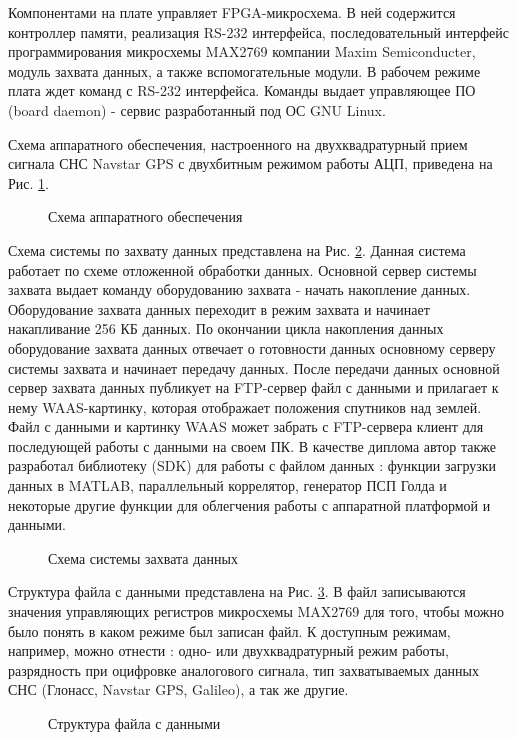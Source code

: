 Компонентами на плате управляет FPGA-микросхема. В ней содержится контроллер памяти, реализация RS-232 интерфейса, последовательный интерфейс программирования микросхемы
MAX2769 компании Maxim Semiconducter, модуль захвата данных, а также вспомогательные модули. В рабочем режиме плата ждет команд с RS-232 интерфейса.
Команды выдает управляющее ПО (board daemon) - сервис разработанный под ОС GNU Linux.

Схема аппаратного обеспечения, настроенного на двухквадратурный прием сигнала СНС Navstar GPS с двухбитным режимом работы АЦП, приведена на Рис. \ref{pic:board_scheme}.
\begin{figure}[h]
	\center{}
	\caption{Схема аппаратного обеспечения}
	\label{pic:board_scheme}
\end{figure}

Схема системы по захвату данных представлена на Рис. \ref{pic:gps_acq_system_scheme}. Данная система работает по схеме отложенной обработки данных. Основной сервер системы захвата
выдает команду оборудованию захвата - начать накопление данных. Оборудование захвата данных переходит в режим захвата и начинает накапливание 256 КБ данных. По окончании цикла
накопления данных оборудование захвата данных отвечает о готовности данных основному серверу системы захвата и начинает передачу данных. После передачи данных основной сервер
захвата данных публикует на FTP-сервер файл с данными и прилагает к нему WAAS-картинку, которая отображает положения спутников над землей. Файл с данными
и картинку WAAS может забрать с FTP-сервера клиент для последующей работы с данными на своем ПК. В качестве диплома автор также разработал библиотеку (SDK) для работы с файлом данных
\cite{github-gpsproject}: функции загрузки данных в MATLAB, параллельный коррелятор, генератор ПСП Голда и некоторые другие функции для облегчения работы с аппаратной платформой
и данными.

\begin{figure}[h]
	\center{}
	\caption{Схема системы захвата данных}
	\label{pic:gps_acq_system_scheme}
\end{figure}

Структура файла с данными представлена на Рис. \ref{pic:dump_file}. В файл записываются значения управляющих регистров микросхемы MAX2769 для того, чтобы можно было
понять в каком режиме был записан файл. К доступным режимам, например, можно отнести \cite{max2769_manual}: одно- или двухквадратурный режим работы, разрядность при оцифровке
аналогового сигнала, тип захватываемых данных СНС (Глонасс, Navstar GPS, Galileo), а так же другие.
\begin{figure}[h]
	\center{}
	\caption{Структура файла с данными}
	\label{pic:dump_file}
\end{figure}

